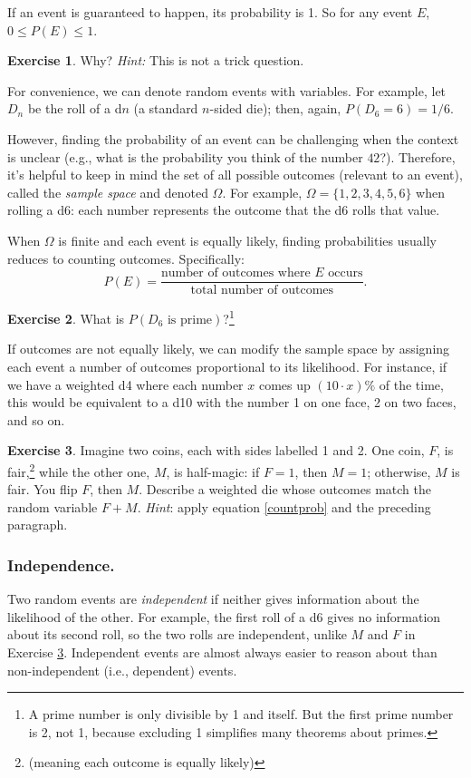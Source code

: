 \documentclass{book}
\theoremstyle{definition}
\newtheorem{exercise}{Exercise}[chapter]
\theoremstyle{colonstylebf}
\newcommand{\set}[1]{\{#1\}}
\begin{document}
If an event is guaranteed to happen, its probability is 1. So for any event $E$, $0 \leq P(E) \leq 1$.
\begin{exercise}
Why? \emph{Hint:} This is not a trick question.
\end{exercise}
For convenience, we can denote random events with variables. For example, let $D_n$ be the roll of a d$n$ (a standard $n$-sided die); then, again, $P(D_6 = 6) = 1/6$.

However, finding the probability of an event can be challenging when the context is unclear (e.g., what is the probability you think of the number $42$?). Therefore, it's helpful to keep in mind the set of all possible outcomes (relevant to an event), called the \emph{sample space} and denoted $\Omega$. For example, $\Omega = \set{1, 2, 3, 4, 5, 6}$ when rolling a d6: each number represents the outcome that the d6 rolls that value.

When $\Omega$ is finite and each event is equally likely, finding probabilities usually reduces to counting outcomes. Specifically:
\begin{equation}\label{countprob}
P(E) = \frac{\text{number of outcomes where $E$ occurs}}{\text{total number of outcomes}}.
\end{equation}
\begin{exercise}
What is $P(D_6 \text{ is prime})$?\footnote{A prime number is only divisible by 1 and itself. But the first prime number is 2, not 1, because excluding 1 simplifies many theorems about primes.}
\end{exercise}

If outcomes are not equally likely, we can modify the sample space by assigning each event a number of outcomes proportional to its likelihood. For instance, if we have a weighted d4 where each number $x$ comes up $(10\cdot x)\%$ of the time, this would be equivalent to a d10 with the number 1 on one face, 2 on two faces, and so on. 
\begin{exercise}\label{magiccoin}
Imagine two coins, each with sides labelled 1 and 2. One coin, $F$, is fair,\footnote{(meaning each outcome is equally likely)} while the other one, $M$, is half-magic: if $F = 1$, then $M = 1$; otherwise, $M$ is fair. You flip $F$, then $M$. Describe a weighted die whose outcomes match the random variable $F + M$. \textit{Hint}: apply equation \eqref{countprob} and the preceding paragraph.
\end{exercise}


\subsubsection*{Independence.}
Two random events are \emph{independent} if neither gives information about the likelihood of the other. For example, the first roll of a d6 gives no information about its second roll, so the two rolls are independent, unlike $M$ and $F$ in Exercise \ref{magiccoin}. Independent events are almost always easier to reason about than non-independent (i.e., dependent) events.
\end{document}
